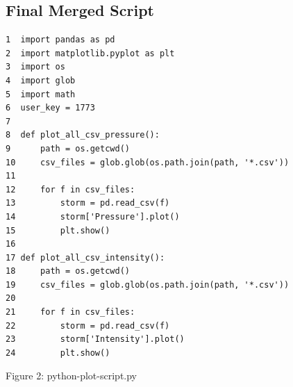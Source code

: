 \documentclass[]{article}
\begin{document}
\subsection{Final Merged Script}
\begin{tcolorbox}[colback=white, colframe=black, boxrule=1pt, arc=2mm, 
    title=python-plot-script.py, fonttitle=\bfseries, listing only, listing options={language=sh, basicstyle=\ttfamily}]
\begin{verbatim}
1  import pandas as pd
2  import matplotlib.pyplot as plt
3  import os
4  import glob
5  import math
6  user_key = 1773
7   
8  def plot_all_csv_pressure():
9      path = os.getcwd()
10     csv_files = glob.glob(os.path.join(path, '*.csv'))
11        
12     for f in csv_files:
13         storm = pd.read_csv(f)
14         storm['Pressure'].plot()
15         plt.show()
16    
17 def plot_all_csv_intensity():
18     path = os.getcwd()
19     csv_files = glob.glob(os.path.join(path, '*.csv'))
20        
21     for f in csv_files:
22         storm = pd.read_csv(f)
23         storm['Intensity'].plot()
24         plt.show()
\end{verbatim}
\end{tcolorbox}
\begin{center}
    Figure 2: python-plot-script.py
\end{center}
\end{document}
